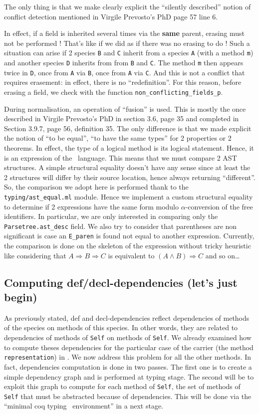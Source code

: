 The only thing is that we make clearly explicit the ``silently
described'' notion of conflict detection mentioned in Virgile
Prevosto's PhD page 57 line 6.

In effect, if a field is inherited several times via the {\bf same}
parent, erasing must not be performed ! That's like if we did as if
there was no erasing to do ! Such a situation can arise if 2 species
{\tt B} and {\tt C} inherit from a species {\tt A} (with a method
{\tt m}) and another species {\tt D} inherits from from {\tt B} and
{\tt C}. The method {\tt m} then appears twice in {\tt D}, once from
{\tt A} via {\tt B}, once from {\tt A} via {\tt C}. And this is not a
conflict that requires erasement: in effect, there is no
``redefinition''. For this reason, before erasing a field, we check
with the function {\tt non\_conflicting\_fields\_p}.

\medskip
During normalisation, an operation of ``fusion'' is used. This is
mostly the once described in Virgile Prevosto's PhD in section 3.6,
page 35 and completed in Section 3.9.7, page 56, definition 35. The
only difference is that we made explicit the notion of ``to be
equal'', ``to have the same types'' for 2 properties or 2 theorems.
In effect, the type of a logical method is its logical
statement. Hence, it is an expression of the \focalize\ language. This
means that we must compare 2 AST structures. A simple structural
equality doesn't have any sense since at least the 2 structures will
differ by their source location, hence always returning ``different''.
So, the comparison we adopt here is performed thank to the
{\tt typing/ast\_equal.ml} module. Hence we implement a custom
structural equality to determine if 2 expressions have the same form
modulo $\alpha$-conversion of the free identifiers. In particular, we
are only interested in comparing only the {\tt Parsetree.ast\_desc}
field. We also try to consider that parentheses are non significant is
case an {\tt E\_paren} is found not equal to another
expression. Currently, the comparison is done on the skeleton of the
expression without tricky heuristic like considering that
$A \Rightarrow B \Rightarrow C$ is equivalent to
$(A \wedge B) \Rightarrow C$ and so on\ldots


\subsection{Computing def/decl-dependencies (let's just begin)}
As previously stated, def and decl-dependencies reflect dependencies
of methods of the species on methods of this species. In other words,
they are related to dependencies of methods of {\tt Self} on methods
of {\tt Self}. We already examined how to compute theses dependencies
for the particular case of the carrier (the method
{\tt representation}) in \label{deps-on-carrier}. We now address this
problem for all the other methods. In fact, dependencies computation
is done in two passes. The first one is to create a simple dependency
graph and is performed at typing stage. The second will be to exploit
this graph to compute for each method of {\tt Self}, the set of
methods of {\tt Self} that must be abstracted because of
dependencies. This will be done via the ``minimal coq typing \coq\
environment'' in a next stage.

